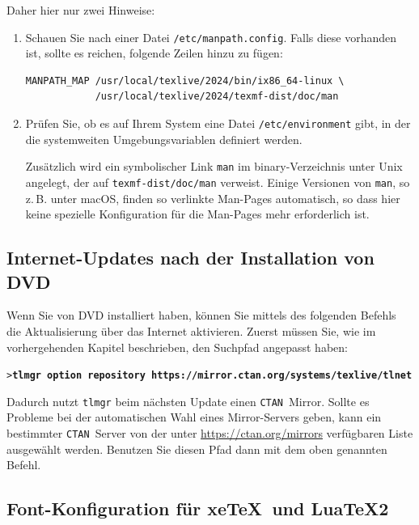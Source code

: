 \documentclass[12pt,ngerman,a4paper,fullparskip]{report}
\newcommand{\acro}[1]{\texttt{#1}}
\newcommand{\cmdname}[1]{\texttt{#1}}
\newcommand{\code}[1]{\texttt{#1}}
\newcommand{\filename}[1]{\texttt{#1}}
\newcommand{\dirname}[1]{\texttt{#1}}
\newcommand{\Ucom}[1]{\textbf{\texttt{#1}}}
\providecommand*{\CTAN}{\acro{CTAN}\xspace}
\providecommand*{\macOS}{macOS\xspace}
\begin{document}
Daher hier nur zwei Hinweise: 

\begin{enumerate}
\item Schauen Sie nach einer Datei
\filename{/etc/manpath.config}. Falls diese vorhanden ist, sollte es reichen, folgende Zeilen
hinzu zu fügen:

\begin{verbatim}
MANPATH_MAP /usr/local/texlive/2024/bin/ix86_64-linux \
            /usr/local/texlive/2024/texmf-dist/doc/man
\end{verbatim}

\item Prüfen Sie, ob es auf Ihrem System eine Datei \filename{/etc/environment} gibt, in der die
systemweiten Umgebungsvariablen definiert werden.

Zusätzlich wird ein symbolischer Link \code{man} im binary-Verzeichnis unter
Unix angelegt, der auf \dirname{texmf-dist/doc/man} verweist. Einige Versionen von \code{man}, so z.\,B. unter \macOS, finden so verlinkte Man-Pages automatisch, so dass hier keine spezielle
Konfiguration für die Man-Pages mehr erforderlich ist.

\end{enumerate}

\subsection{Internet-Updates nach der Installation von DVD}
\label{sec:dvd-install-net-updates}


Wenn Sie von DVD installiert haben, können Sie mittels des folgenden Befehls die Aktualisierung über das Internet aktivieren. Zuerst müssen Sie, wie im vorhergehenden Kapitel beschrieben, den Suchpfad angepasst haben:

\begin{alltt}
> \Ucom{tlmgr option repository https://mirror.ctan.org/systems/texlive/tlnet}
\end{alltt}

\noindent Dadurch nutzt \cmdname{tlmgr} beim nächsten Update einen \CTAN\ Mirror. Sollte es Probleme bei der automatischen Wahl eines Mirror-Servers geben, kann ein bestimmter \CTAN\ Server von der unter \url{https://ctan.org/mirrors} verfügbaren Liste ausgewählt werden. Benutzen Sie diesen Pfad dann mit dem oben genannten Befehl.

\subsection{Font-Konfiguration für xe\TeX\ und Lua\TeX2}\label{sec:font-conf-xetex}
\end{document}
